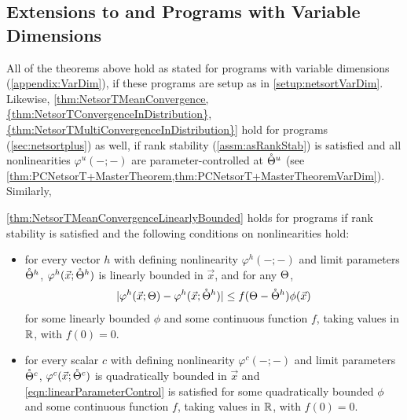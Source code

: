 \documentclass[main.tex]{subfiles}
\begin{document}
\subsection{Extensions to \netsortplus{} and Programs with Variable Dimensions}

All of the theorems above hold as stated for programs with variable dimensions (\cref{appendix:VarDim}), if these programs are setup as in \cref{setup:netsortVarDim}.
Likewise, \cref{thm:NetsorTMeanConvergence,{thm:NetsorTConvergenceInDistribution},{thm:NetsorTMultiConvergenceInDistribution}} hold for \netsortplus{} programs (\cref{sec:netsortplus}) as well, if rank stability (\cref{assm:asRankStab}) is satisfied and all nonlinearities $\varphi^u(-;-)$ are parameter-controlled at $\mathring{\Theta}^u$ (see \cref{thm:PCNetsorT+MasterTheorem,thm:PCNetsorT+MasterTheoremVarDim}).
Similarly, 
\begin{thm}\label{thm:NetsorT+MeanConvergenceLinearlyBounded}
    \cref{thm:NetsorTMeanConvergenceLinearlyBounded} holds for \netsortplus{} programs if rank stability is satisfied and the following conditions on nonlinearities hold:
    \begin{itemize}
        \item for every vector $h$ with defining nonlinearity $\varphi^h(-;-)$ and limit parameters $\mathring{\Theta}^h$, $\varphi^h(\vec x; \mathring {\Theta}^h)$ is linearly bounded in $\vec x$, and for any $\Theta$,
        \begin{align}
            |\varphi^h(\vec x; \bigtheta) - \varphi^h(\vec x; \mathring \bigtheta^h)| \le f(\bigtheta - \mathring \bigtheta^h) \phi(\vec x)
            \label{eqn:linearParameterControl}
        \end{align}
        for some linearly bounded $\phi$ and some continuous function $f$, taking values in $\mathbb{R}$, with $f(0) = 0$.
        \item for every scalar $c$ with defining nonlinearity $\varphi^c(-;-)$ and limit parameters $\mathring{\Theta}^c$, $\varphi^c(\vec x; \mathring {\Theta}^c)$ is quadratically bounded in $\vec x$ and \cref{eqn:linearParameterControl} is satisfied for some quadratically bounded $\phi$ and some continuous function $f$, taking values in $\mathbb{R}$, with $f(0) = 0$.
    \end{itemize}
\end{thm}
\end{document}
